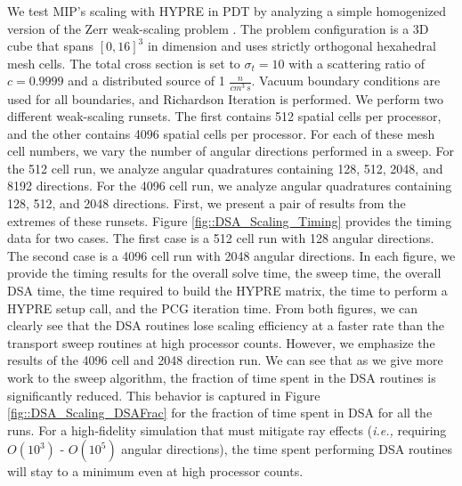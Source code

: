 We test MIP's scaling with HYPRE in PDT by analyzing a simple homogenized version of the Zerr weak-scaling problem \cite{zerr2011solution}. The problem configuration is a 3D cube that spans $[0,16]^3$ in dimension and uses strictly orthogonal hexahedral mesh cells. The total cross section is set to $\sigma_t=10$ with a scattering ratio of $c=0.9999$ and a distributed source of 1 $\frac{n}{cm^3 \, s}$. Vacuum boundary conditions are used for all boundaries, and Richardson Iteration is performed. We perform two different weak-scaling runsets. The first contains 512 spatial cells per processor, and the other contains 4096 spatial cells per processor. For each of these mesh cell numbers, we vary the number of angular directions performed in a sweep. For the 512 cell run, we analyze angular quadratures containing 128, 512, 2048, and 8192 directions. For the 4096 cell run, we analyze angular quadratures containing 128, 512, and 2048 directions. First, we present a pair of results from the extremes of these runsets. Figure \ref{fig::DSA_Scaling_Timing} provides the timing data for two cases. The first case is a 512 cell run with 128 angular directions. The second case is a 4096 cell run with 2048 angular directions. In each figure, we provide the timing results for the overall solve time, the sweep time, the overall DSA time, the time required to build the HYPRE matrix, the time to perform a HYPRE setup call, and the PCG iteration time. From both figures, we can clearly see that the DSA routines lose scaling efficiency at a faster rate than the transport sweep routines at high processor counts. However, we emphasize the results of the 4096 cell and 2048 direction run. We can see that as we give more work to the sweep algorithm, the fraction of time spent in the DSA routines is significantly reduced. This behavior is captured in Figure \ref{fig::DSA_Scaling_DSAFrac} for the fraction of time spent in DSA for all the runs. For a high-fidelity simulation that must mitigate ray effects ({\em i.e.,} requiring $O(10^3)$ - $O(10^5)$ angular directions), the time spent performing DSA routines will stay to a minimum even at high processor counts.

